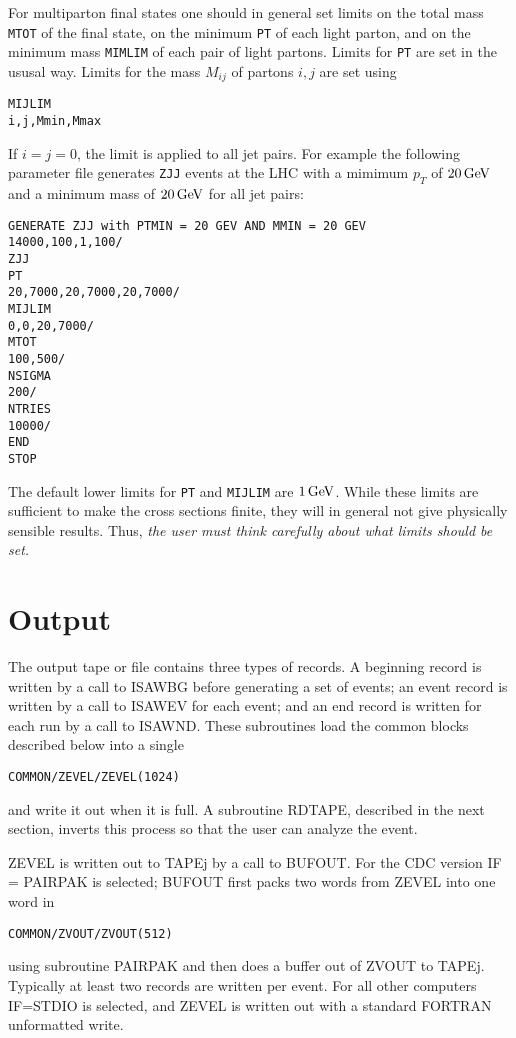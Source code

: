       For multiparton final states one should in general set limits
on the total mass \verb|MTOT| of the final state, on the minimum
\verb|PT| of each light parton, and on the minimum mass \verb|MIMLIM|
of each pair of light partons. Limits for \verb|PT| are set in the
ususal way. Limits for the mass $M_{ij}$ of partons $i,j$ are set using
\begin{verbatim}
MIJLIM
i,j,Mmin,Mmax
\end{verbatim}
If $i=j=0$, the limit is applied to all jet pairs. For example the
following parameter file generates \verb|ZJJ| events at the LHC with a
mimimum $p_T$ of $20\,{\rm GeV}$ and a minimum mass of $20\,{\rm GeV}$ for all
jet pairs:
\begin{verbatim}
GENERATE ZJJ with PTMIN = 20 GEV AND MMIN = 20 GEV
14000,100,1,100/
ZJJ
PT
20,7000,20,7000,20,7000/
MIJLIM
0,0,20,7000/
MTOT
100,500/
NSIGMA
200/
NTRIES
10000/
END
STOP
\end{verbatim}
The default lower limits for \verb|PT| and \verb|MIJLIM| are
$1\,{\rm GeV}$. While these limits are sufficient to make the cross
sections finite, they will in general not give physically sensible
results. Thus, {\it the user must think carefully about what limits
should be set.}
\newpage
\section{Output\label{OUTPUT}}

      The output tape or file contains three types of records. A
beginning record is written by a call to ISAWBG before generating a set
of events; an event record is written by a call to ISAWEV for each
event; and an end record is written for each run by a call to ISAWND.
These subroutines load the common blocks described below into a single
\begin{verbatim}
COMMON/ZEVEL/ZEVEL(1024) 
\end{verbatim}
and write it out when it is full. A subroutine RDTAPE, described in
the next section, inverts this process so that the user can analyze
the event.

      ZEVEL is written out to TAPEj by a call to BUFOUT. For the CDC
version IF = PAIRPAK is selected; BUFOUT first packs two words from
ZEVEL into one word in 
\begin{verbatim}
COMMON/ZVOUT/ZVOUT(512) 
\end{verbatim}
using subroutine PAIRPAK and then does a buffer out of ZVOUT to TAPEj.
Typically at least two records are written per event. For all other
computers IF=STDIO is selected, and ZEVEL is written out with a
standard FORTRAN unformatted write.


